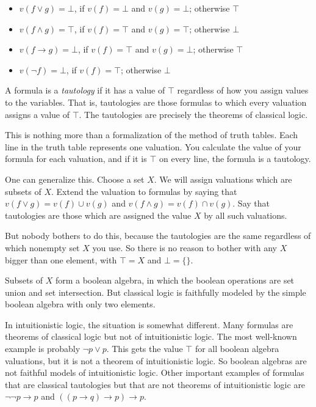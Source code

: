 \documentclass{article}
\def\imp{\rightarrow}           %
\begin{document}
\begin{itemize}
\item $v(f\vee g) = \bot$, if $v(f) = \bot$ and $v(g) = \bot$;
  otherwise $\top$
\item $v(f\wedge g) = \top$, if $v(f) = \top$ and $v(g) = \top$;
  otherwise $\bot$
\item $v(f\imp g) = \bot$, if $v(f) = \top$ and $v(g) = \bot$;
  otherwise $\top$
\item $v(\neg f) = \bot$, if $v(f) = \top$; otherwise $\bot$
\end{itemize}

A formula is a {\em tautology\/} if it has a value of $\top$
regardless of how you assign values to the variables.  That is,
tautologies are those formulas to which every valuation assigns a
value of $\top$.  The tautologies are precisely the theorems of
classical logic.

This is nothing more than a formalization of the method of truth
tables.  Each line in the truth table represents one valuation.  You
calculate the value of your formula for each valuation, and if it is
$\top$ on every line, the formula is a tautology.

One can generalize this.  Choose a set $X$.  We will assign valuations
which are subsets of $X$.  Extend the valuation to formulas by saying
that $v(f\vee g) = v(f)\cup v(g)$ and $v(f\wedge g) = v(f)\cap v(g)$.
Say that tautologies are those which are assigned the value $X$ by all
such valuations.

But nobody bothers to do this, because the tautologies are the same
regardless of which nonempty set $X$ you use.  So there is no reason
to bother with any $X$ bigger than one element, with $\top = X$ and
$\bot = \{\}$.    

Subsets of $X$ form a boolean algebra, in which the boolean operations
are set union and set intersection.  But classical logic is faithfully
modeled by the simple boolean algebra with only two elements.

In intuitionistic logic, the situation is somewhat different.  Many
formulas are theorems of classical logic but not of intuitionistic
logic.  The most well-known example is probably $\neg p\vee p$.
This gets the value $\top$ for all boolean algebra valuations, but it
is not a theorem of intuitionistic logic.  So boolean algebras are not
faithful models of intuitionistic logic.  Other important examples of
formulas that are classical tautologies but that are not theorems of
intuitionistic logic are $\neg\neg p\imp p$ and $((p\imp q)\imp p)\imp
p$.
\end{document}
